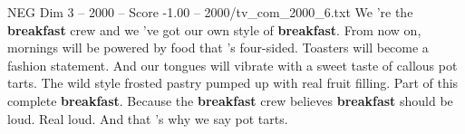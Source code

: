 \begin{textsample}{NEG Dim 3 – 2000 – Score -1.00 – 2000/tv\_com\_2000\_6.txt}  \label{ex:f3_neg_004}
We 're the \textbf{breakfast} crew and we 've got our own style of \textbf{breakfast}.
From now on, mornings will be powered by food that 's four-sided.
Toasters will become a fashion statement.
And our tongues will vibrate with a sweet taste of callous pot tarts.
The wild style frosted pastry pumped up with real fruit filling.
Part of this complete \textbf{breakfast}.
Because the \textbf{breakfast} crew believes \textbf{breakfast} should be loud.
Real loud.
And that 's why we say pot tarts.

\end{textsample}
